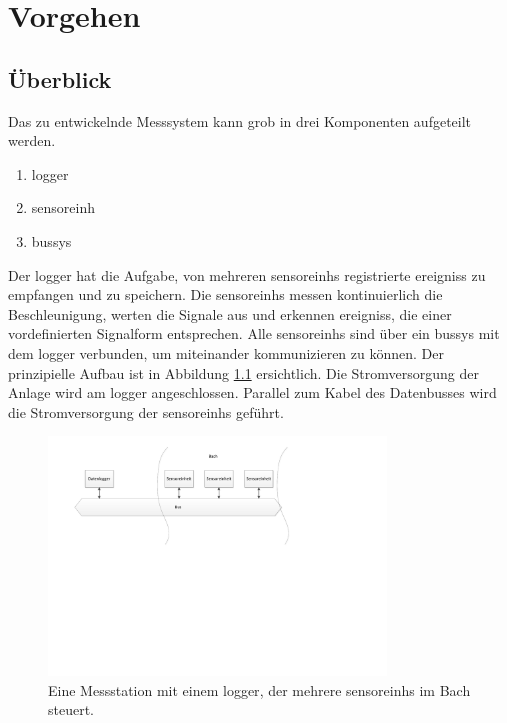 %
%

\chapter{Vorgehen}\label{chap.vorgehen}
\section{Überblick}\label{sec.ueberblick}
Das zu entwickelnde Messsystem kann grob in drei Komponenten aufgeteilt werden. 
\begin{enumerate}
\item \gls{logger}
\item \gls{sensoreinh}
\item \gls{bussys}
\end{enumerate}
Der \gls{logger} hat die Aufgabe, von mehreren \glspl{sensoreinh} registrierte \glspl{ereignis} zu empfangen und zu speichern. Die \glspl{sensoreinh} messen kontinuierlich die Beschleunigung, werten die Signale aus und erkennen \glspl{ereignis}, die einer vordefinierten Signalform entsprechen. Alle \glspl{sensoreinh} sind über ein \gls{bussys} mit dem \gls{logger} verbunden, um miteinander kommunizieren zu können. Der prinzipielle Aufbau ist in Abbildung \ref{fig.situationskroki} ersichtlich. Die Stromversorgung der Anlage wird am \gls{logger} angeschlossen. Parallel zum Kabel des Datenbusses wird die Stromversorgung der \glspl{sensoreinh} geführt.

\begin{figure}[H]
	\centering
		\includegraphics[width=0.8\textwidth]{images/visio/Situationskroki.pdf}
	\caption{Eine Messstation mit einem \gls{logger}, der mehrere \glspl{sensoreinh} im Bach steuert.}
	\label{fig.situationskroki}
\end{figure}

